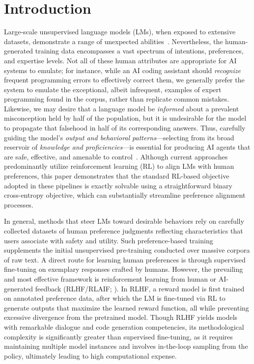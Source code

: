 \section{Introduction}
Large-scale unsupervised language models (LMs), when exposed to extensive datasets, demonstrate a range of unexpected abilities~\citep{chowdhery2022palm, brown2020language, touvron2023llama,bubeck2023sparks}. Nevertheless, the human-generated training data encompasses a vast spectrum of intentions, preferences, and expertise levels. Not all of these human attributes are appropriate for AI systems to emulate; for instance, while an AI coding assistant should \textit{recognize} frequent programming errors to effectively correct them, we generally prefer the system to emulate the exceptional, albeit infrequent, examples of expert programming found in the corpus, rather than replicate common mistakes. Likewise, we may desire that a language model be \textit{informed} about a prevalent misconception held by half of the population, but it is undesirable for the model to propagate that falsehood in half of its corresponding answers. Thus, carefully guiding the model's \emph{output and behavioral patterns}—selecting from its broad reservoir of \textit{knowledge and proficiencies}—is essential for producing AI agents that are safe, effective, and amenable to control~\citep{ouyang2022training}. Although current approaches predominantly utilize reinforcement learning (RL) to align LMs with human preferences, this paper demonstrates that the standard RL-based objective adopted in these pipelines is exactly solvable using a straightforward binary cross-entropy objective, which can substantially streamline preference alignment processes.

In general, methods that steer LMs toward desirable behaviors rely on carefully collected datasets of human preference judgments reflecting characteristics that users associate with safety and utility. Such preference-based training supplements the initial unsupervised pre-training conducted over massive corpora of raw text. A direct route for learning human preferences is through supervised fine-tuning on exemplary responses crafted by humans. However, the prevailing and most effective framework is reinforcement learning from human or AI-generated feedback (RLHF/RLAIF; \citep{christiano2017deep,bai2022constitutional}). In RLHF, a reward model is first trained on annotated preference data, after which the LM is fine-tuned via RL to generate outputs that maximize the learned reward function, all while preventing excessive divergence from the pretrained model. Though RLHF yields models with remarkable dialogue and code generation competencies, its methodological complexity is significantly greater than supervised fine-tuning, as it requires maintaining multiple model instances and involves in-the-loop sampling from the policy, ultimately leading to high computational expense.

